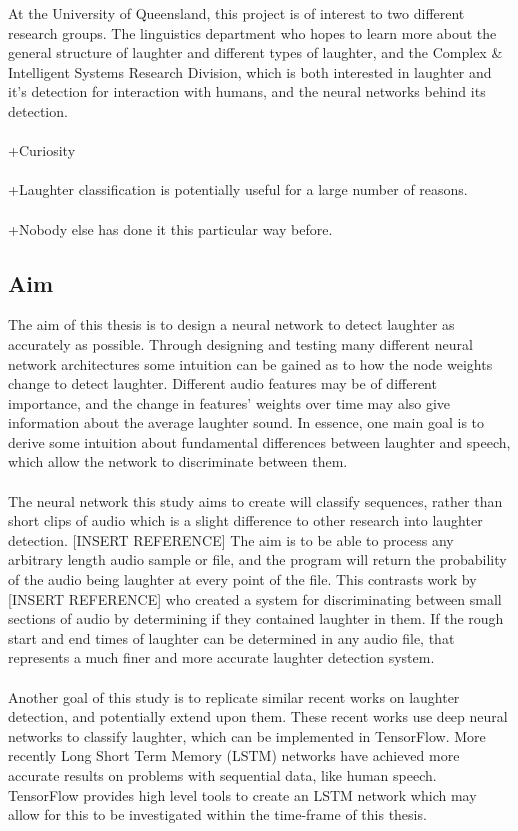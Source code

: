 \documentclass[a4paper,11pt,notitlepage]{article}
\begin{document}
At the University of Queensland, this project is of interest to two different research groups. The linguistics department who hopes to learn more about the general structure of laughter and different types of laughter, and the Complex \& Intelligent Systems Research Division, which is both interested in laughter and it's detection for interaction with humans, and the neural networks behind its detection.\\
\\
+Curiosity\\
\\
+Laughter classification is potentially useful for a large number of reasons.\\
\\
+Nobody else has done it this particular way before.

\subsection{Aim}


The aim of this thesis is to design a neural network to detect laughter as accurately as possible. Through designing and testing many different neural network architectures some intuition can be gained as to how the node weights change to detect laughter. Different audio features may be of different importance, and the change in features' weights over time may also give information about the average laughter sound. In essence, one main goal is to derive some intuition about fundamental differences between laughter and speech, which allow the network to discriminate between them.\\
\\
The neural network this study aims to create will classify sequences, rather than short clips of audio which is a slight difference to other research into laughter detection. [INSERT REFERENCE] The aim is to be able to process any arbitrary length audio sample or file, and the program will return the probability of the audio being laughter at every point of the file. This contrasts work by [INSERT REFERENCE] who created a system for discriminating between small sections of audio by determining if they contained laughter in them. If the rough start and end times of laughter can be determined in any audio file, that represents a much finer and more accurate laughter detection system.\\
\\
Another goal of this study is to replicate similar\cite{gosztolya2016laughter} recent works on laughter detection, and potentially extend upon them. These recent works use deep neural networks to classify laughter, which can be implemented in TensorFlow. More recently Long Short Term Memory (LSTM) networks have achieved more accurate results on problems with sequential data, like human speech.\cite{hannun2014deep,mozilladeepspeech} TensorFlow provides high level tools to create an LSTM network which may allow for this to be investigated within the time-frame of this thesis.
\end{document}
